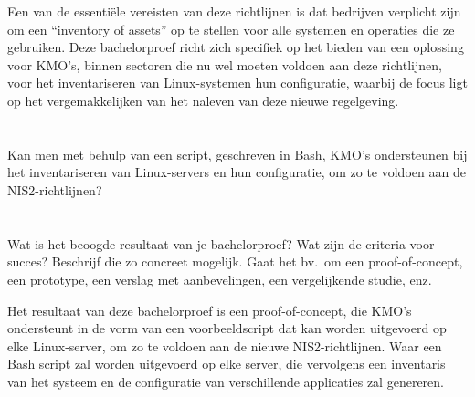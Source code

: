 Een van de essenti\"ele vereisten van deze richtlijnen is dat bedrijven verplicht zijn om een ``inventory of assets'' op te stellen voor alle systemen en operaties die ze gebruiken.
Deze bachelorproef richt zich specifiek op het bieden van een oplossing voor KMO's, binnen sectoren die nu wel moeten voldoen aan deze richtlijnen, voor het inventariseren van Linux-systemen hun configuratie, waarbij de focus ligt op het vergemakkelijken van het naleven van deze nieuwe regelgeving.

\section{}%
\label{sec:onderzoeksvraag}

Kan men met behulp van een script, geschreven in Bash, KMO's ondersteunen bij het inventariseren van Linux-servers en hun configuratie, om zo te voldoen aan de NIS2-richtlijnen?

\section{}%
\label{sec:onderzoeksdoelstelling}

Wat is het beoogde resultaat van je bachelorproef? Wat zijn de criteria voor succes? Beschrijf die zo concreet mogelijk. Gaat het bv.\ om een proof-of-concept, een prototype, een verslag met aanbevelingen, een vergelijkende studie, enz.

Het resultaat van deze bachelorproef is een proof-of-concept, die KMO's ondersteunt in de vorm van een voorbeeldscript dat kan worden uitgevoerd op elke Linux-server, om zo te voldoen aan de nieuwe NIS2-richtlijnen.
Waar een Bash script zal worden uitgevoerd op elke server, die vervolgens een inventaris van het systeem en de configuratie van verschillende applicaties zal genereren.

\section{}%
\label{sec:opzet-bachelorproef}


